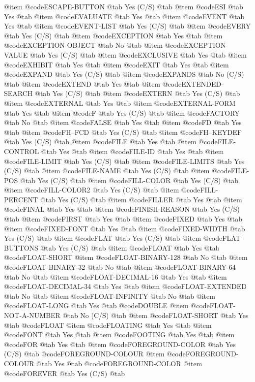 @item @code{ESCAPE-BUTTON} @tab Yes	(C/S) @tab 
@item @code{ESI} @tab Yes @tab 
@item @code{EVALUATE} @tab Yes @tab 
@item @code{EVENT} @tab Yes @tab 
@item @code{EVENT-LIST} @tab Yes	(C/S) @tab 
@item @code{EVERY} @tab Yes	(C/S) @tab 
@item @code{EXCEPTION} @tab Yes @tab 
@item @code{EXCEPTION-OBJECT} @tab No @tab 
@item @code{EXCEPTION-VALUE} @tab Yes	(C/S) @tab 
@item @code{EXCLUSIVE} @tab Yes @tab 
@item @code{EXHIBIT} @tab Yes @tab 
@item @code{EXIT} @tab Yes @tab 
@item @code{EXPAND} @tab Yes	(C/S) @tab 
@item @code{EXPANDS} @tab No	(C/S) @tab 
@item @code{EXTEND} @tab Yes @tab 
@item @code{EXTENDED-SEARCH} @tab Yes	(C/S) @tab 
@item @code{EXTERN} @tab Yes	(C/S) @tab 
@item @code{EXTERNAL} @tab Yes @tab 
@item @code{EXTERNAL-FORM} @tab Yes @tab 
@item @code{F} @tab Yes	(C/S) @tab 
@item @code{FACTORY} @tab No @tab 
@item @code{FALSE} @tab Yes @tab 
@item @code{FD} @tab Yes @tab 
@item @code{FH--FCD} @tab Yes	(C/S) @tab 
@item @code{FH--KEYDEF} @tab Yes	(C/S) @tab 
@item @code{FILE} @tab Yes @tab 
@item @code{FILE-CONTROL} @tab Yes @tab 
@item @code{FILE-ID} @tab Yes @tab 
@item @code{FILE-LIMIT} @tab Yes	(C/S) @tab 
@item @code{FILE-LIMITS} @tab Yes	(C/S) @tab 
@item @code{FILE-NAME} @tab Yes	(C/S) @tab 
@item @code{FILE-POS} @tab Yes	(C/S) @tab 
@item @code{FILL-COLOR} @tab Yes	(C/S) @tab 
@item @code{FILL-COLOR2} @tab Yes	(C/S) @tab 
@item @code{FILL-PERCENT} @tab Yes	(C/S) @tab 
@item @code{FILLER} @tab Yes @tab 
@item @code{FINAL} @tab Yes @tab 
@item @code{FINISH-REASON} @tab Yes	(C/S) @tab 
@item @code{FIRST} @tab Yes @tab 
@item @code{FIXED} @tab Yes @tab 
@item @code{FIXED-FONT} @tab Yes @tab 
@item @code{FIXED-WIDTH} @tab Yes	(C/S) @tab 
@item @code{FLAT} @tab Yes	(C/S) @tab 
@item @code{FLAT-BUTTONS} @tab Yes	(C/S) @tab 
@item @code{FLOAT} @tab Yes @tab @code{FLOAT-SHORT}
@item @code{FLOAT-BINARY-128} @tab No @tab 
@item @code{FLOAT-BINARY-32} @tab No @tab 
@item @code{FLOAT-BINARY-64} @tab No @tab 
@item @code{FLOAT-DECIMAL-16} @tab Yes @tab 
@item @code{FLOAT-DECIMAL-34} @tab Yes @tab 
@item @code{FLOAT-EXTENDED} @tab No @tab 
@item @code{FLOAT-INFINITY} @tab No @tab 
@item @code{FLOAT-LONG} @tab Yes @tab @code{DOUBLE}
@item @code{FLOAT-NOT-A-NUMBER} @tab No	(C/S) @tab 
@item @code{FLOAT-SHORT} @tab Yes @tab @code{FLOAT}
@item @code{FLOATING} @tab Yes @tab 
@item @code{FONT} @tab Yes @tab 
@item @code{FOOTING} @tab Yes @tab 
@item @code{FOR} @tab Yes @tab 
@item @code{FOREGROUND-COLOR} @tab Yes	(C/S) @tab @code{FOREGROUND-COLOUR}
@item @code{FOREGROUND-COLOUR} @tab Yes @tab @code{FOREGROUND-COLOR}
@item @code{FOREVER} @tab Yes	(C/S) @tab 
